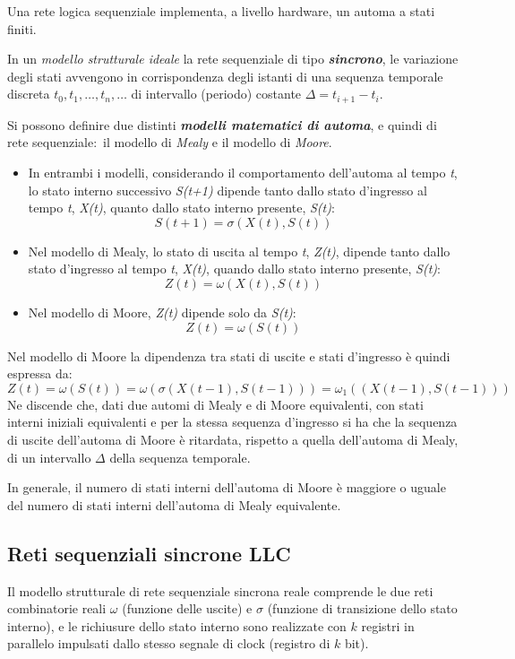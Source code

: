 Una rete logica sequenziale implementa, a livello hardware, un automa a stati finiti.

In un \textit{modello strutturale ideale} la rete sequenziale di tipo \textbf{\textit{sincrono}}, le variazione degli stati avvengono in corrispondenza degli istanti di una sequenza temporale discreta $t_0, t_1, \dots, t_n, \dots$ di intervallo (periodo) costante $\Delta = t_{i+1}-t_i$.

Si possono definire due distinti \textbf{\textit{modelli matematici di automa}}, e quindi di rete sequenziale:\ il modello di \textit{Mealy} e il modello di \textit{Moore}.

\begin{itemize}
    \item In entrambi i modelli, considerando il comportamento dell'automa al tempo \textit{t}, lo stato interno successivo \textit{S(t+1)} dipende tanto dallo stato d'ingresso al tempo \textit{t}, \textit{X(t)}, quanto dallo stato interno presente, \textit{S(t)}:
          \[S(t+1) = \sigma(X(t), S(t))\]
    \item Nel modello di Mealy, lo stato di uscita al tempo \textit{t}, \textit{Z(t)}, dipende tanto dallo stato d'ingresso al tempo \textit{t}, \textit{X(t)}, quando dallo stato interno presente, \textit{S(t)}:
          \[Z(t) = \omega(X(t), S(t))\]
    \item Nel modello di Moore, \textit{Z(t)} dipende solo da \textit{S(t)}:
          \[Z(t) = \omega(S(t))\]
\end{itemize}

\noindent Nel modello di Moore la dipendenza tra stati di uscite e stati d'ingresso è quindi espressa da:
\[Z(t) = \omega(S(t)) = \omega(\sigma(X(t-1), S(t-1))) = \omega_1((X(t-1), S(t-1)))\]
Ne discende che, dati due automi di Mealy e di Moore equivalenti, con stati interni iniziali equivalenti e per la stessa sequenza d'ingresso si ha che la sequenza di uscite dell'automa di Moore è ritardata, rispetto a quella dell'automa di Mealy, di un intervallo $\Delta$ della sequenza temporale.

In generale, il numero di stati interni dell'automa di Moore è maggiore o uguale del numero di stati interni dell'automa di Mealy equivalente.

\subsection{Reti sequenziali sincrone LLC}

Il modello strutturale di rete sequenziale sincrona reale comprende le due reti combinatorie reali $\omega$ (funzione delle uscite) e $\sigma$ (funzione di transizione dello stato interno), e le richiusure dello stato interno sono realizzate con $k$ registri in parallelo impulsati dallo stesso segnale di clock (registro di $k$ bit).

